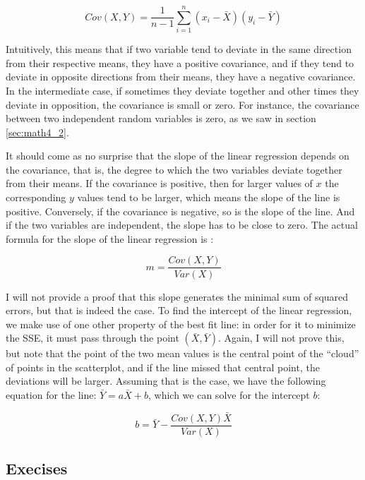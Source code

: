 \documentclass[
  letterpaper,
  DIV=11,
  numbers=noendperiod]{scrreprt}
\begin{document}
\[ Cov(X,Y) = \frac{1}{n-1} \sum_{i=1}^n (x_i - \bar X) (y_i - \bar Y) 
\]

Intuitively, this means that if two variable tend to deviate in the same
direction from their respective means, they have a positive covariance,
and if they tend to deviate in opposite directions from their means,
they have a negative covariance. In the intermediate case, if sometimes
they deviate together and other times they deviate in opposition, the
covariance is small or zero. For instance, the covariance between two
independent random variables is zero, as we saw in section
\ref{sec:math4_2}.

It should come as no surprise that the slope of the linear regression
depends on the covariance, that is, the degree to which the two
variables deviate together from their means. If the covariance is
positive, then for larger values of \(x\) the corresponding \(y\) values
tend to be larger, which means the slope of the line is positive.
Conversely, if the covariance is negative, so is the slope of the line.
And if the two variables are independent, the slope has to be close to
zero. The actual formula for the
slope of
the linear regression is \cite{whitlock_analysis_2008}:

\begin{equation}
m = \frac{Cov(X,Y)}{Var(X)}
\end{equation}

I will not provide a proof that this slope generates the minimal sum of
squared errors, but that is indeed the case. To find the intercept of
the linear regression, we make use of one other property of the best fit
line: in order for it to minimize the SSE, it must pass through the
point \((\bar X, \bar Y)\). Again, I will not prove this, but note that
the point of the two mean values is the central point of the ``cloud''
of points in the scatterplot, and if the line missed that central point,
the deviations will be larger. Assuming that is the case, we have the
following equation for the line: \(\bar Y = a\bar X + b\), which we can
solve for the 
 intercept \(b\):

\begin{equation}
b = \bar Y - \frac{Cov(X,Y) \bar X}{Var(X)}
\end{equation}

\hypertarget{execises}{%
\subsection{Execises}\label{execises}}
\end{document}
